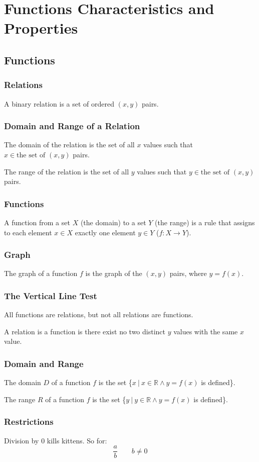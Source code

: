 \chapter{Functions Characteristics and Properties}
	\section{Functions}
		\subsection{Relations}
			A binary relation is a set of ordered $(x, y)$ pairs.
		\subsection{Domain and Range of a Relation}
			The domain of the relation is the set of all $x$ values such that $x \in \text{the set of } (x, y)$ pairs.

			The range of the relation is the set of all $y$ values such that $y \in \text{the set of } (x, y)$ pairs.
		\subsection{Functions}
			A function from a set $X$ (the domain) to a set $Y$ (the range) is a rule that assigns to each element $x \in X$ exactly one element $y \in Y$ ($f : X \rightarrow Y$).
		\subsection{Graph}
			The graph of a function $f$ is the graph of the $(x, y)$ pairs, where $y = f(x)$.
		\subsection{The Vertical Line Test}
			All functions are relations, but not all relations are functions.

			A relation is a function is there exist no two distinct $y$ values with the same $x$ value.
		\subsection{Domain and Range}
			The domain $D$ of a function $f$ is the set \{$x\ |\ x \in \mathbb{R} \wedge y=f(x)$ is defined\}.

			The range $R$ of a function $f$ is the set \{$y\ |\ y \in \mathbb{R} \wedge y=f(x)$ is defined\}.
		\subsection{Restrictions}
			Division by 0 kills kittens. So for:
			\[\frac{a}{b} \qquad b \neq 0\]

